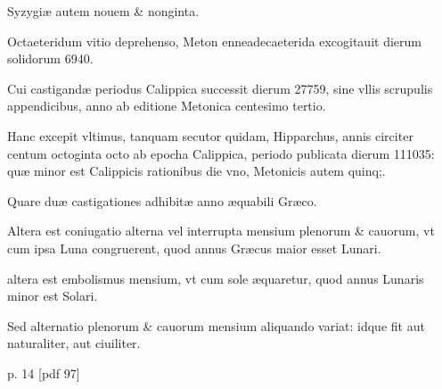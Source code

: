 \begin{parnumbers}
Syzygiæ autem nouem \& nonginta.

Octaeteridum
vitio deprehenso, Meton enneadecaeterida excogitauit dierum
solidorum 6940.

Cui castigandæ periodus Calippica successit dierum
27759, sine vllis scrupulis appendicibus, anno ab editione Metonica
centesimo tertio.

Hanc excepit vltimus, tanquam secutor quidam,
Hipparchus, annis circiter centum octoginta octo ab epocha Calippica,
periodo publicata dierum 111035: quæ minor est Calippicis rationibus
die vno, Metonicis autem quinq;.

Quare duæ castigationes adhibitæ
anno æquabili Græco.

Altera est coniugatio alterna vel interrupta
mensium plenorum \& cauorum, vt cum ipsa Luna congruerent, quod
annus Græcus maior esset Lunari.

altera est embolismus mensium, vt
cum sole æquaretur, quod annus Lunaris minor est Solari.

Sed alternatio
plenorum \& cauorum mensium aliquando variat: idque fit aut
naturaliter, aut ciuiliter.

\end{parnumbers}
\clearpage
p. 14 [pdf 97]
